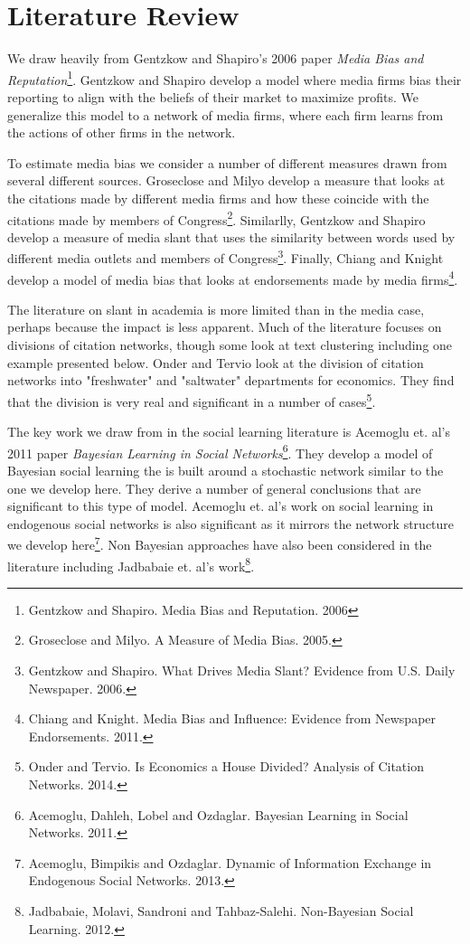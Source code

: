 \documentclass[a4paper]{article}
\begin{document}
\section{Literature Review}

We draw heavily from Gentzkow and Shapiro's 2006 paper \emph{Media Bias and Reputation}\footnote{Gentzkow and Shapiro.  Media Bias and Reputation. 2006}.  Gentzkow and Shapiro develop a model where media firms bias their reporting to align with the beliefs of their market to maximize profits.  We generalize this model to a network of media firms, where each firm learns from the actions of other firms in the network.

To estimate media bias we consider a number of different measures drawn from several different sources.  Groseclose and Milyo develop a measure that looks at the citations made by different media firms and how these coincide with the citations made by members of Congress\footnote{Groseclose and Milyo. A Measure of Media Bias. 2005.}.  Similarlly, Gentzkow and Shapiro develop a measure of media slant that uses the similarity between words used by different media outlets and members of Congress\footnote{Gentzkow and Shapiro.  What Drives Media Slant?  Evidence from U.S. Daily Newspaper. 2006.}.  Finally, Chiang and Knight develop a model of media bias that looks at endorsements made by media firms\footnote{Chiang and Knight.  Media Bias and Influence: Evidence from Newspaper Endorsements. 2011.}.

The literature on slant in academia is more limited than in the media case, perhaps because the impact is less apparent.  Much of the literature focuses on divisions of citation networks, though some look at text clustering including one example presented below.  Onder and Tervio look at the division of citation networks into "freshwater" and "saltwater" departments for economics.  They find that the division is very real and significant in a number of cases\footnote{Onder and Tervio.  Is Economics a House Divided?  Analysis of Citation Networks.  2014.}.

The key work we draw from in the social learning literature is Acemoglu et. al's 2011 paper \emph{Bayesian Learning in Social Networks}\footnote{Acemoglu, Dahleh, Lobel and Ozdaglar.  Bayesian Learning in Social Networks. 2011.}.  They develop a model of Bayesian social learning the is built around a stochastic network similar to the one we develop here.  They derive a number of general conclusions that are significant to this type of model. Acemoglu et. al's work on social learning in endogenous social networks is also significant as it mirrors the network structure we develop here\footnote{Acemoglu, Bimpikis and Ozdaglar.  Dynamic of Information Exchange in Endogenous Social Networks.  2013.}.  Non Bayesian approaches have also been considered in the literature including Jadbabaie et. al's work\footnote{Jadbabaie, Molavi, Sandroni and Tahbaz-Salehi.  Non-Bayesian Social Learning.  2012.}.
\end{document}
